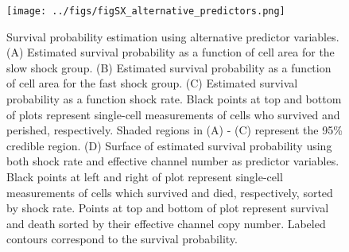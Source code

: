 \begin{figure}
\centering
\texttt{[image: ../figs/figSX\_alternative\_predictors.png]}
\caption{Survival
probability
estimation
using
alternative
predictor
variables.
(A)
Estimated
survival
probability
as a
function
of
cell
area
for
the
slow
shock
group.
(B)
Estimated
survival
probability
as a
function
of
cell
area
for
the
fast
shock
group.
(C)
Estimated
survival
probability
as a
function
shock
rate.
Black
points
at top
and
bottom
of
plots
represent
single-cell
measurements
of
cells
who
survived
and
perished,
respectively.
Shaded
regions
in (A)
- (C)
represent
the
95\%
credible
region.
(D)
Surface
of
estimated
survival
probability
using
both
shock
rate
and
effective
channel
number
as
predictor
variables.
Black
points
at
left
and
right
of
plot
represent
single-cell
measurements
of
cells
which
survived
and
died,
respectively,
sorted
by
shock
rate.
Points
at top
and
bottom
of
plot
represent
survival
and
death
sorted
by
their
effective
channel
copy
number.
Labeled
contours
correspond
to the
survival
probability.}\label{fig:alternative_predictor_variables}
\end{figure}

